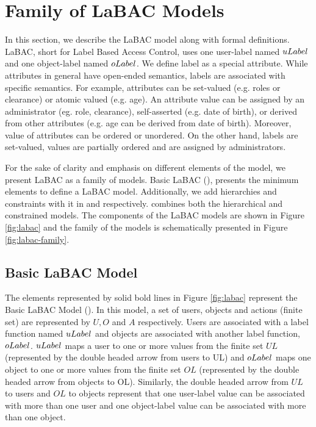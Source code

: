 

	

		
	

\section{Family of LaBAC Models}
\label{sec:model}


In this section, we describe the LaBAC model  along with formal definitions. LaBAC, short for Label Based Access Control, uses one user-label named $uLabel$ and one object-label named $oLabel$. We define label as a special attribute. While attributes in general have open-ended semantics, labels are associated with specific semantics. For example, attributes can be set-valued (e.g. roles or clearance) or atomic valued (e.g. age). An attribute value can be assigned by an administrator (eg. role, clearance), self-asserted (e.g. date of birth), or derived from other attributes (e.g. age can be derived from date of birth). Moreover, value of attributes can be ordered or unordered.  On the other hand, labels are set-valued, values are partially ordered and are assigned by administrators. 



For the sake of clarity and emphasis on different elements of the model, we present LaBAC as a family of models. Basic LaBAC (\clabac), presents the minimum elements to define a LaBAC model. Additionally, we add hierarchies and constraints with it in \hlabac{} and  \consLabac{} respectively.  \labacOneOneOne{} combines both the hierarchical and constrained models. The components of the LaBAC models are shown in Figure \ref{fig:labac} and the family of the models is schematically presented in Figure \ref{fig:labac-family}.
	
	
\subsection{Basic LaBAC Model}
The elements represented by solid bold lines in Figure \ref{fig:labac} represent the Basic LaBAC Model (\clabac{}). In this model, a set of users, objects and actions (finite set) are represented by $U, O$ and $A$ respectively. Users are associated with a label function named $uLabel$ and objects are associated with another label function, $oLabel$. $uLabel$ maps a user to one or more values from the finite set  $UL$ (represented by the double headed arrow from users to UL) and $oLabel$ maps one object to one or more values from the finite set $OL$ (represented by the double headed arrow from objects to OL). Similarly, the double headed arrow from $UL$  to users and $OL$ to objects represent that one user-label value can be associated with more than one user and one object-label value can be associated with more than one object. 




